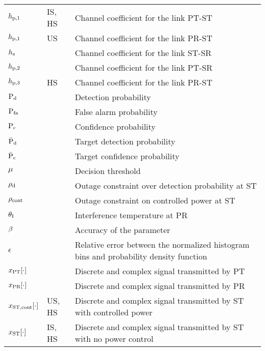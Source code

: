 \begin{longtable}{p{}p{}p{}}
       $h_{\text{p,1}}$                  & IS, HS &         Channel coefficient for the link PT-ST \\
       $h_{\text{p,1}}$                  & US &             Channel coefficient for the link PR-ST \\
       $h_{\text{s}}$                   &  &     Channel coefficient for the link ST-SR \\
       $h_{\text{p,2}}$                  &  &     Channel coefficient for the link PT-SR \\
       $h_{\text{p,3}}$                 & HS &             Channel coefficient for the link PR-ST \\

       $\text{P}_{\text{d}}$                   & &             Detection probability \\ 
       $\text{P}_{\text{fa}}$                  & &             False alarm probability \\ 
       $\text{P}_{\text{c}}$                  & &             Confidence probability \\ 
       $\bar{\text{P}}_{\text{d}}$                  & &             Target detection probability \\ 
       $\bar{\text{P}}_{\text{c}}$                 & &             Target confidence probability \\ 
       $\mu$                   & &             Decision threshold \\ 
       $\rho_{\text{d}}$                  & &             Outage constraint over detection probability at ST \\ 
       $\rho_{\text{cont}}$                  & &             Outage constraint on controlled power at ST \\ 
       $\theta_{\text{I}}$                  & &             Interference temperature at PR \\ 
       $\beta$	               & &             Accuracy of the parameter \\	
       $\epsilon$	       & &             Relative error between the normalized histogram bins and probability density function  \\	

	$x_{\text{PT}}[\cdot]$       & &             Discrete and complex signal transmitted by PT \\	
	$x_{\text{PR}}[\cdot]$       & &             Discrete and complex signal transmitted by PR \\	
	$x_{\text{ST,cont}}[\cdot]$       & US, HS &             Discrete and complex signal transmitted by ST with controlled power \\	
	$x_{\text{ST}}[\cdot]$       & IS, HS &             Discrete and complex signal transmitted by ST with no power control\\	


\end{longtable}
